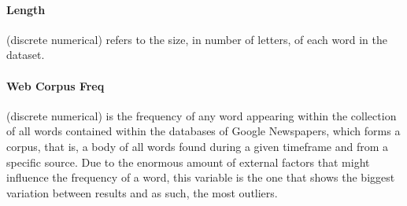\documentclass[a4paper,11pt,dvipsnames]{article}
\begin{document}
\paragraph{Length} (discrete numerical) refers to the size, in number of letters, of each word in the dataset.

\paragraph{Web Corpus Freq} (discrete numerical) is the frequency of any word appearing within the collection of all words contained within the databases of Google Newspapers, which forms a corpus, that is, a body of all words found during a given timeframe and from a specific source. Due to the enormous amount of external factors that might influence the frequency of a word, this variable is the one that shows the biggest variation between results and as such, the most outliers.
\end{document}
